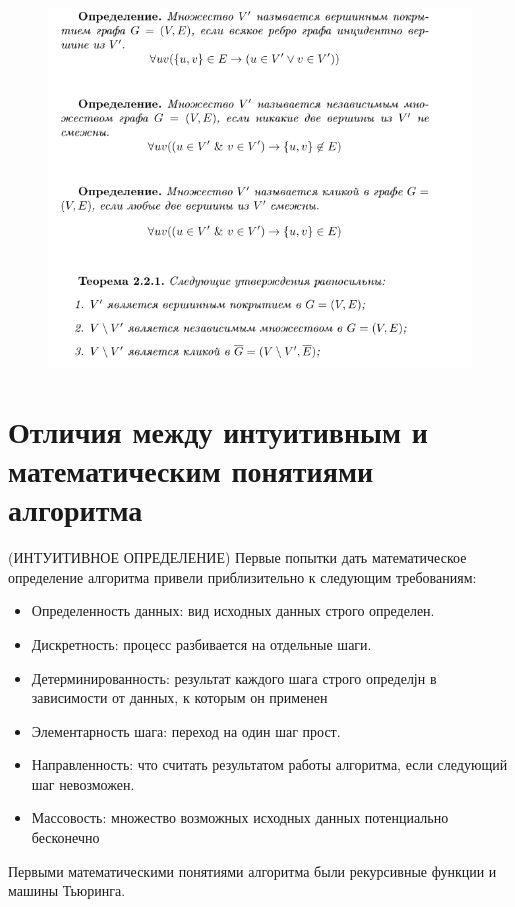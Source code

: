 \documentclass[40pt]{article}
\begin{document}
    \begin{figure}[h!]
        \includegraphics[width=1\textwidth]{./images/21.png}
        \centering
    \end{figure}

\section{Отличия между интуитивным и математическим понятиями алгоритма}
(ИНТУИТИВНОЕ ОПРЕДЕЛЕНИЕ)
Первые попытки дать математическое определение алгоритма
привели приблизительно к следующим требованиям:
\begin{itemize}
    \item Определенность данных: вид исходных данных строго определен.
    \item Дискретность: процесс разбивается на отдельные шаги.
    \item Детерминированность: результат каждого шага строго определјн в зависимости от данных, к которым он применен
    \item Элементарность шага: переход на один шаг прост.
    \item Направленность: что считать результатом работы алгоритма,
если следующий шаг невозможен.
    \item Массовость: множество возможных исходных данных потенциально бесконечно
\end{itemize}

Первыми математическими понятиями
алгоритма были рекурсивные функции и машины Тьюринга.
\end{document}
